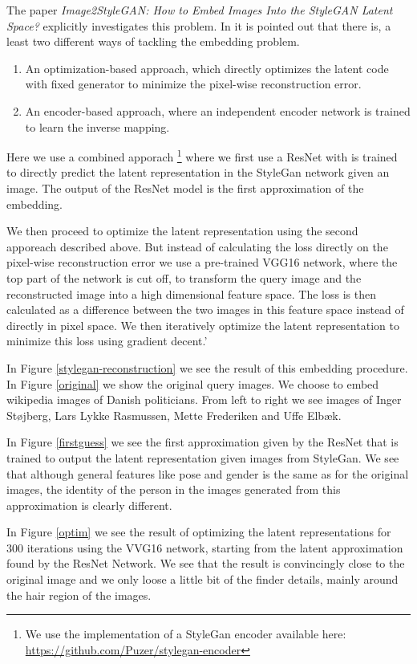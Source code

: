 The paper \textit{Image2StyleGAN: How to Embed Images Into the StyleGAN Latent Space?}\cite{Image2StyleGAN} explicitly investigates this problem.
In \cite{interfacegan} it is pointed out that there is, a least two different ways of tackling the embedding problem.

\begin{enumerate}
    \item An optimization-based
    approach, which directly optimizes the latent code with fixed generator to minimize the pixel-wise reconstruction error.
    \item An encoder-based approach, where an independent encoder network is trained to learn the inverse mapping.
\end{enumerate}

Here we use a combined apporach \footnote{We use the implementation of a StyleGan encoder available here: \url{https://github.com/Puzer/stylegan-encoder}}
where we first use a ResNet with is trained to directly predict the latent representation in the StyleGan network given an image. The output of the ResNet model is the first approximation of the embedding.

We then proceed to optimize the latent representation using the second apporeach described above. But instead of calculating the loss directly on the pixel-wise reconstruction error we use a pre-trained VGG16 network, where the top part of the network is cut off,  to transform the query image and the reconstructed image into a high dimensional feature space. The loss is then calculated as a difference between the two images in this feature space instead of directly in pixel space. We then iteratively optimize the latent representation to minimize this loss using gradient decent.'

In Figure \ref{stylegan-reconstruction} we see the result of this embedding procedure. In Figure \ref{original} we show the original query images. We choose to embed wikipedia images of Danish politicians. From left to right we see images of Inger Støjberg, Lars Lykke Rasmussen, Mette Frederiken and Uffe Elbæk.

In Figure \ref{firstguess} we see the first approximation given by the ResNet that is trained to output the latent representation given images from StyleGan. We see that although general features like pose and gender is the same as for the original images, the identity of the person in the images generated from this approximation is clearly different.

In Figure \ref{optim} we see the result of optimizing the latent representations for 300 iterations using the VVG16 network, starting from the latent approximation found by the ResNet Network. We see that the result is convincingly close to the original image and we only loose a little bit of the finder details, mainly around the hair region of the images.

